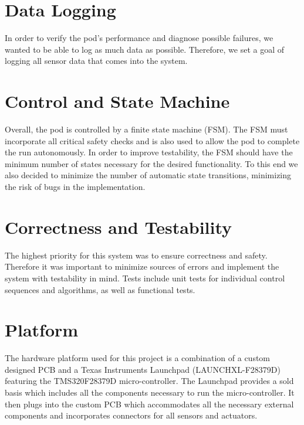 \section{Data Logging}

In order to verify the pod's performance and diagnose possible failures, we wanted to be able to log as much data as possible. Therefore, we set a goal of logging all sensor data that comes into the system.


\section{Control and State Machine}

Overall, the pod is controlled by a finite state machine (FSM). The FSM must incorporate all critical safety checks and is also used to allow the pod to complete the run autonomously. In order to improve testability, the FSM should have the minimum number of states necessary for the desired functionality. To this end we also decided to minimize the number of automatic state transitions, minimizing the risk of bugs in the implementation.

\section{Correctness and Testability}

The highest priority for this system was to ensure correctness and safety. Therefore it was important to minimize sources of errors and implement the system with testability in mind. Tests include unit tests for individual control sequences and algorithms, as well as functional tests.

\section{Platform}

The hardware platform used for this project is a combination of a custom designed PCB and a Texas Instruments Launchpad (LAUNCHXL-F28379D)\cite{launchpad} featuring the TMS320F28379D micro-controller\cite{mcu}. The Launchpad provides a sold basis which includes all the components necessary to run the micro-controller. It then plugs into the custom PCB which accommodates all the necessary external components and incorporates connectors for all sensors and actuators.

